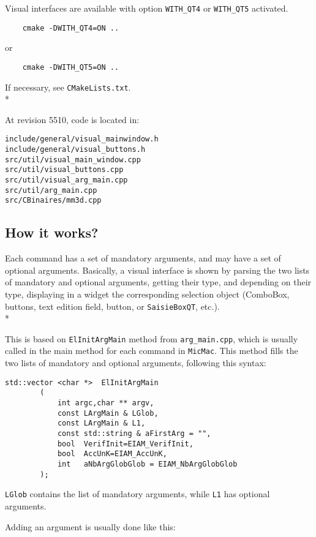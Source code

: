 \documentclass[a4paper]{book}
\begin{document}
Visual interfaces are available with option {\tt WITH\_QT4} or {\tt WITH\_QT5} activated.

\begin{verbatim}
    cmake -DWITH_QT4=ON ..
\end{verbatim}
 or
\begin{verbatim}
    cmake -DWITH_QT5=ON ..
\end{verbatim}

If necessary, see {\tt CMakeLists.txt}.\\*

At revision 5510, code is located in:
\begin{verbatim}
include/general/visual_mainwindow.h
include/general/visual_buttons.h
src/util/visual_main_window.cpp
src/util/visual_buttons.cpp
src/util/visual_arg_main.cpp
src/util/arg_main.cpp
src/CBinaires/mm3d.cpp
\end{verbatim}

\subsection{How it works?}

Each command has a set of mandatory arguments, and may have a set of optional arguments. Basically, a visual interface is shown by parsing the two lists of mandatory and optional arguments, getting their type, and depending on their type, displaying in a widget the corresponding selection object (ComboBox, buttons, text edition field, button, or {\tt SaisieBoxQT}, etc.).\\*

This is based on {\tt ElInitArgMain} method from {\tt arg\_main.cpp}, which is usually called in the main method for each command in {\tt MicMac}. This method fills the two lists of mandatory and optional arguments, following this syntax:

\begin{verbatim}
std::vector <char *>  ElInitArgMain
        (
            int argc,char ** argv,
            const LArgMain & LGlob,
            const LArgMain & L1,
            const std::string & aFirstArg = "",
            bool  VerifInit=EIAM_VerifInit,
            bool  AccUnK=EIAM_AccUnK,
            int   aNbArgGlobGlob = EIAM_NbArgGlobGlob
        );
\end{verbatim}

 {\tt LGlob} contains the list of mandatory arguments, while  {\tt L1} has optional arguments.

Adding an argument is usually done like this: 
\end{document}
